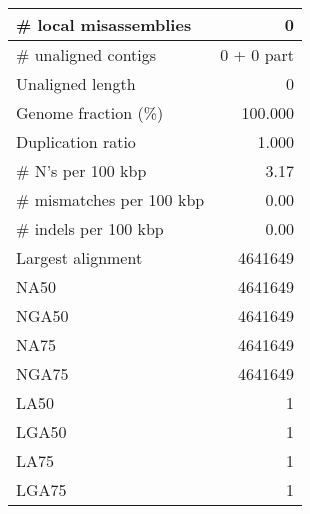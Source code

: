 \documentclass[12pt,a4paper]{article}
\begin{document}
\begin{table}[ht]
\begin{center}
\begin{tabular}{|l*{1}{|r}|}
\# local misassemblies & 0 \\ \hline
\# unaligned contigs & 0 + 0 part \\ \hline
Unaligned length & 0 \\ \hline
Genome fraction (\%) & 100.000 \\ \hline
Duplication ratio & 1.000 \\ \hline
\# N's per 100 kbp & 3.17 \\ \hline
\# mismatches per 100 kbp & 0.00 \\ \hline
\# indels per 100 kbp & 0.00 \\ \hline
Largest alignment & 4641649 \\ \hline
NA50 & 4641649 \\ \hline
NGA50 & 4641649 \\ \hline
NA75 & 4641649 \\ \hline
NGA75 & 4641649 \\ \hline
LA50 & 1 \\ \hline
LGA50 & 1 \\ \hline
LA75 & 1 \\ \hline
LGA75 & 1 \\ \hline
\end{tabular}
\end{center}
\end{table}
\end{document}
